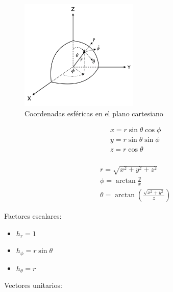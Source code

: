 \begin{figure}[H]
    \centering
    \includegraphics[width=0.5\textwidth]{Resultados Útiles/imgs/coords_esferc_DFI.png}
    \caption{Coordenadas esféricas en el plano cartesiano}
    \label{fig:C.esfericas}
\end{figure}

\begin{minipage}{0.55\textwidth}
\begin{equation}
\begin{split}
    &x = r\sin{\theta}\cos{\phi}\\
    &y = r\sin{\theta}\sin{\phi}\\
    &z = r\cos{\theta}\\
\end{split}
\nonumber
\end{equation}
\end{minipage}
\begin{minipage}{0.35\textwidth}
\begin{equation}
\begin{split}
    & r = \sqrt{x^2+y^2+z^2}\\
    & \phi = \arctan{\frac{y}{x}}\\
    & \theta = \arctan{\left(\frac{\sqrt{x^2+ y^2}}{z}\right)}
\end{split}
\nonumber
\end{equation}
\end{minipage}

\bigbreak
Factores escalares:
\begin{itemize}
    \item $h_r = 1$
    \item $h_\phi = r\sin{\theta}$
    \item $h_\theta = r$
\end{itemize}
\bigbreak
Vectores unitarios:

